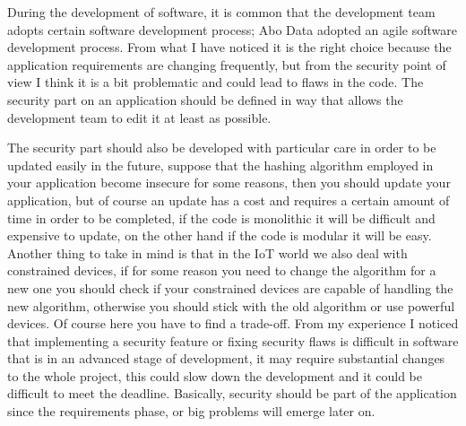 During the development of software, it is common that the development team adopts certain software development process; Abo Data adopted an agile software development process.\newline
From what I have noticed it is the right choice because the application requirements are changing frequently, but from the security point of view I think it is a bit problematic and could lead to flaws in the code.\newline
The security part on an application should be defined in way that allows the development team to edit it at least as possible.\newline

The security part should also be developed with particular care in order to be updated easily in the future, suppose that the hashing algorithm employed in your application become insecure for some reasons, then you should update your application, but of course an update has a cost and requires a certain amount of time in order to be completed, if the code is monolithic it will be difficult and expensive to update, on the other hand if the code is modular it will be easy.\newline
Another thing to take in mind is that in the IoT world we also deal with constrained devices, if for some reason you need to change the algorithm for a new one you should check if your constrained devices are capable of handling the new algorithm, otherwise you should stick with the old algorithm or use powerful devices. Of course here you have to find a trade-off.\newline
From my experience I noticed that implementing a security feature or fixing security flaws is difficult in software that is in an advanced stage of development, it may require substantial changes to the whole project, this could slow down the development and it could be difficult to meet the deadline.\newline
Basically, security should be part of the application since the requirements phase, or big problems will emerge later on.\newline

